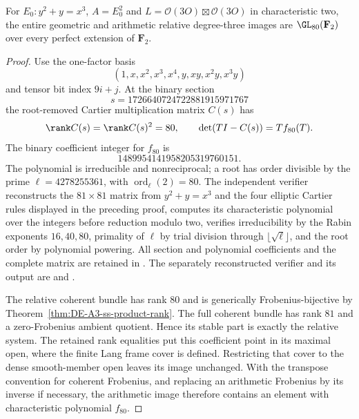 \begin{theorem}\label{thm:ss-product-degree-three-full-group}
For $E_0:y^2+y=x^3$, $A=E_0^2$ and
$L=\mathcal O(3O)\boxtimes\mathcal O(3O)$ in characteristic two, the
entire geometric and arithmetic relative degree-three images are
$\GL_{80}(\mathbf F_2)$ over every perfect extension of $\mathbf F_2$.
\end{theorem}
\begin{proof}
Use the one-factor basis
\[
                  (1,x,x^2,x^3,x^4,y,xy,x^2y,x^3y)
\]
and tensor bit index $9i+j$.
At the binary section
\[
                      s=1726640724722881915971767
\]
the root-removed Cartier multiplication matrix $C(s)$ has
\[
       \rank C(s)=\rank C(s)^2=80,
       \qquad \det(TI-C(s))=T f_{80}(T).
\]
The binary coefficient integer for $f_{80}$ is
\[
                         1489954141958205319760151.
\]
The polynomial is irreducible and nonreciprocal; a root has order
divisible by the prime $\ell=4278255361$, with
$\operatorname{ord}_{\ell}(2)=80$.
The independent verifier reconstructs the $81\times81$ matrix from
$y^2+y=x^3$ and the four elliptic Cartier rules displayed in the
preceding proof, computes its characteristic polynomial over the
integers before reduction modulo two, verifies irreducibility by the
Rabin exponents $16,40,80$, primality of $\ell$ by trial division through
$\lfloor\sqrt\ell\rfloor$, and the root order by polynomial powering.
All section and polynomial coefficients and the complete matrix are
retained in
.
The separately reconstructed verifier and its output are
and
.

The relative coherent bundle has rank $80$ and is generically
Frobenius-bijective by Theorem~\ref{thm:DE-A3-ss-product-rank}.
The full coherent bundle has rank $81$ and a zero-Frobenius ambient
quotient. Hence its stable part is exactly the relative system.
The retained rank equalities put this coefficient point in its maximal
open, where the finite Lang frame cover is defined. Restricting that
cover to the dense smooth-member open leaves its image unchanged.
With the transpose convention for coherent Frobenius, and replacing
an arithmetic Frobenius by its inverse if necessary, the arithmetic
image therefore contains an element with characteristic polynomial
$f_{80}$.


\end{proof}
